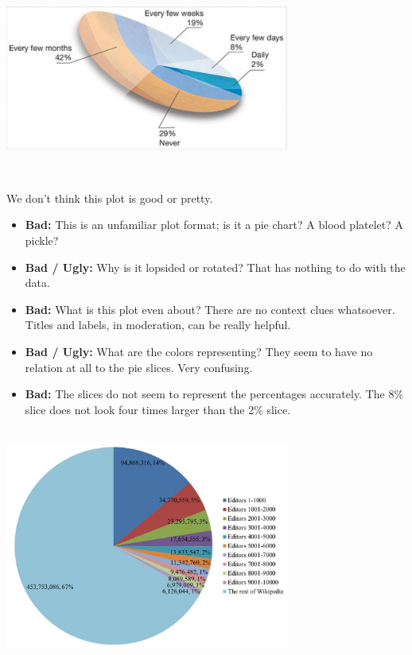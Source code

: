 \documentclass[
]{book}
\providecommand{\tightlist}{%
  \setlength{\itemsep}{0pt}\setlength{\parskip}{0pt}}
\begin{document}
~\\

\includegraphics[width=0.7\textwidth,height=\textheight]{img/vis2.jpeg}

~

We don't think this plot is good or pretty.

\begin{itemize}
\tightlist
\item
  \textbf{Bad:} This is an unfamiliar plot format; is it a pie chart? A blood platelet? A pickle?
\item
  \textbf{Bad / Ugly:} Why is it lopsided or rotated? That has nothing to do with the data.
\item
  \textbf{Bad:} What is this plot even about? There are no context clues whatsoever. Titles and labels, in moderation, can be really helpful.
\item
  \textbf{Bad / Ugly:} What are the colors representing? They seem to have no relation at all to the pie slices. Very confusing.
\item
  \textbf{Bad:} The slices do not seem to represent the percentages accurately. The 8\% slice does not look four times larger than the 2\% slice.
\end{itemize}

~\\

\includegraphics[width=0.7\textwidth,height=\textheight]{img/vis3.jpg}
\end{document}
